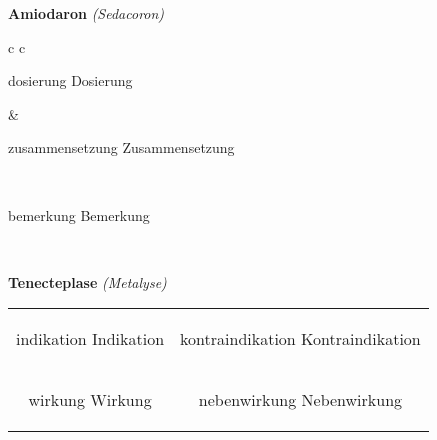 \documentclass[12pt]{beamer}
\begin{document}
\begin{frame}{
    \textbf{Amiodaron}
    \textit{(Sedacoron)}
}
    \begin{tabular}{c c}
        \begin{beamercolorbox}[wd=\boxwidth\textwidth,ht=\boxheight\textheight,sep=1em]{dosierung}
        Dosierung
        \end{beamercolorbox} & 
        \begin{beamercolorbox}[wd=\boxwidth\textwidth,ht=\boxheight\textheight,sep=1em]{zusammensetzung}
        Zusammensetzung
        \end{beamercolorbox} \\
        \begin{beamercolorbox}[wd=\textwidth,ht=\boxheight\textheight,sep=1em]{bemerkung}
        Bemerkung
        \end{beamercolorbox} \\
    \end{tabular}
\end{frame}

\begin{frame}{
    \textbf{Tenecteplase}
    \textit{(Metalyse)}
}
    \begin{tabular}{c c}
        \begin{beamercolorbox}[wd=\boxwidth\textwidth,ht=\boxheight\textheight,sep=1em]{indikation}
        Indikation
        \end{beamercolorbox} & 
        \begin{beamercolorbox}[wd=\boxwidth\textwidth,ht=\boxheight\textheight,sep=1em]{kontraindikation}
        Kontraindikation 
        \end{beamercolorbox} \\
        \begin{beamercolorbox}[wd=\boxwidth\textwidth,ht=\boxheight\textheight,sep=1em]{wirkung}
        Wirkung
        \end{beamercolorbox} & 
        \begin{beamercolorbox}[wd=\boxwidth\textwidth,ht=\boxheight\textheight,sep=1em]{nebenwirkung}
        Nebenwirkung
        \end{beamercolorbox} \\
    \end{tabular}
\end{frame}
\end{document}
